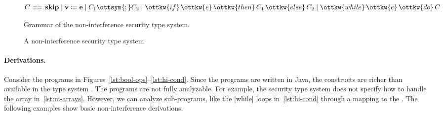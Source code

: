 \begin{figure}[t]
\centering\begin{align*}
C \, ::={ }& \, \mathbf{skip} \mid
\mathbf{v}\coloneqq{}\mathbf{e} \mid
\nonterm C_{{\mathrm{1}}}  \ottsym{;}  \nonterm C_{{\mathrm{2}}} \mid
\ottkw{if} \, \ottkw{e} \, \ottkw{then} \, \nonterm C_{{\mathrm{1}}} \, \ottkw{else} \, \nonterm C_{{\mathrm{2}}} \mid
\ottkw{while} \, \ottkw{e} \, \ottkw{do} \, \nonterm C
\end{align*}
\caption[Grammar of the non-interference security type system]
{Grammar of the non-interference security type system.}\label{fig:ni-syntax}
\end{figure}
\begin{figure}[t]
\centering{}
\centering{}
\caption[Non-interference security type system]{A non-interference security type system.}\label{fig:ni-types}
\end{figure}

\paragraph*{Derivations.}
Consider the programs in Figures~\ref{lst:bool-ops}--\ref{lst:hi-cond}.
Since the programs are written in Java, the constructs are richer than available in the type system .
The programs are not fully analyzable.
For example, the {security type system} does not specify how to handle the array in~\autoref{lst:ni-arrays}.
However, we can analyze sub-programs, like the \pr|while| loops in~\autoref{lst:hi-cond} through a mapping to the .
The following examples show basic non-interference derivations.


